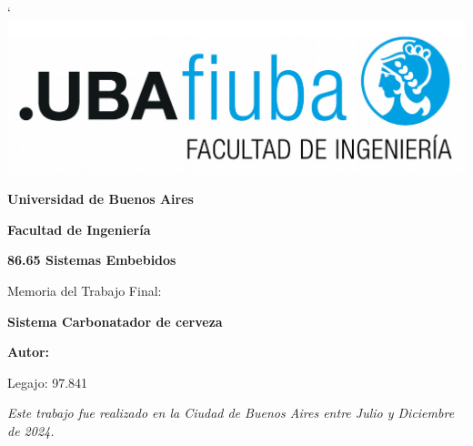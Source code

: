 \begin{titlepage}

`\centering \includegraphics[width=0.75\linewidth]{caratula/img/logo-fiuba.png}

\vspace{1em}

\begin{center}
  \Large{\textbf{Universidad de Buenos Aires}}
  
  \Large{\textbf{Facultad de Ingeniería}}
  
  \Large{\textbf{86.65 Sistemas Embebidos}}  
\end{center}

\vspace{3em}

\centering \Large{Memoria del Trabajo Final:}

\centering \Large{\textbf{Sistema Carbonatador de cerveza}}

\vspace{3em}

\centering \Large{\textbf{Autor:}}


\vspace{3em}

\centering \Large{Legajo: 97.841} 

\vfill

\centering \textit{Este trabajo fue realizado en la Ciudad de Buenos Aires entre Julio y Diciembre de 2024.}

\hrulefill

\end{titlepage}

